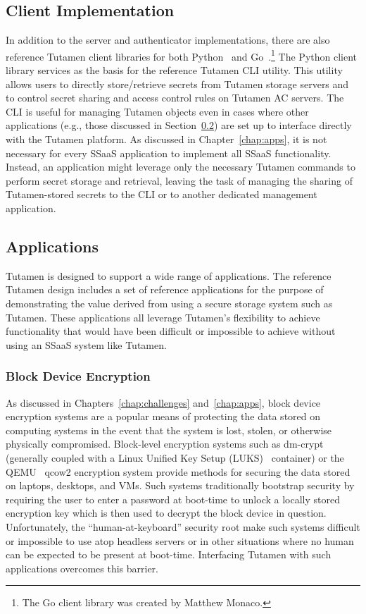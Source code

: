 \subsection{Client Implementation}
\label{chap:tutamen:imp:client}

In addition to the server and authenticator implementations, there are
also reference Tutamen client libraries for both
Python~\cite{src-tutamen-pytutamen} and
Go~\cite{src-tutamen-go}.\footnote{The Go client library was created
  by Matthew Monaco.} The Python client library services as the basis
for the reference Tutamen CLI utility. This utility allows users to
directly store/retrieve secrets from Tutamen storage servers and to
control secret sharing and access control rules on Tutamen AC
servers. The CLI is useful for managing Tutamen objects even in cases
where other applications (e.g., those discussed in
Section~\ref{chap:tutamen:imp:apps}) are set up to interface directly
with the Tutamen platform. As discussed in Chapter~\ref{chap:apps}, it
is not necessary for every SSaaS application to implement all SSaaS
functionality. Instead, an application might leverage only the
necessary Tutamen commands to perform secret storage and retrieval,
leaving the task of managing the sharing of Tutamen-stored secrets to
the CLI or to another dedicated management application.

\subsection{Applications}
\label{chap:tutamen:imp:apps}

Tutamen is designed to support a wide range of applications.  The
reference Tutamen design includes a set of reference applications for
the purpose of demonstrating the value derived from using a secure
storage system such as Tutamen. These applications all leverage
Tutamen's flexibility to achieve functionality that would have been
difficult or impossible to achieve without using an SSaaS system like
Tutamen.

\subsubsection{Block Device Encryption}

As discussed in Chapters~\ref{chap:challenges} and~\ref{chap:apps},
block device encryption systems are a popular means of protecting the
data stored on computing systems in the event that the system is lost,
stolen, or otherwise physically compromised.  Block-level encryption
systems such as dm-crypt~\cite{dm-crypt} (generally coupled with a
Linux Unified Key Setup (LUKS)~\cite{luks} container) or the
QEMU~\cite{qemu} qcow2 encryption system provide methods for securing
the data stored on laptops, desktops, and VMs. Such systems
traditionally bootstrap security by requiring the user to enter a
password at boot-time to unlock a locally stored encryption key which
is then used to decrypt the block device in question. Unfortunately,
the ``human-at-keyboard'' security root make such systems difficult or
impossible to use atop headless servers or in other situations where
no human can be expected to be present at boot-time. Interfacing
Tutamen with such applications overcomes this barrier.

